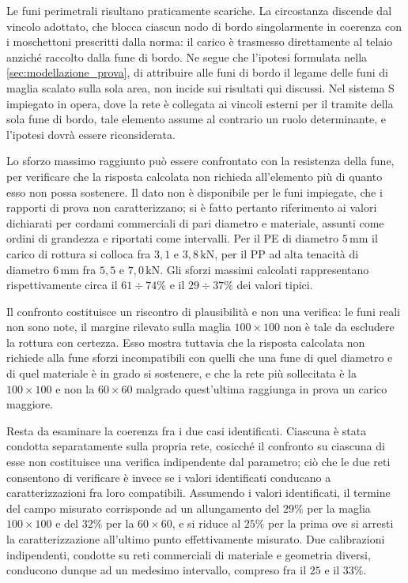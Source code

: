 Le funi perimetrali risultano praticamente scariche. La circostanza discende dal vincolo adottato, che blocca ciascun nodo di bordo singolarmente in coerenza con i moschettoni prescritti dalla norma: il carico è trasmesso direttamente al telaio anziché raccolto dalla fune di bordo. Ne segue che l'ipotesi formulata nella \cref{sec:modellazione_prova}, di attribuire alle funi di bordo il legame delle funi di maglia scalato sulla sola area, non incide sui risultati qui discussi. Nel sistema S impiegato in opera, dove la rete è collegata ai vincoli esterni per il tramite della sola fune di bordo, tale elemento assume al contrario un ruolo determinante, e l'ipotesi dovrà essere riconsiderata.

Lo sforzo massimo raggiunto può essere confrontato con la resistenza della fune, per verificare che la risposta calcolata non richieda all'elemento più di quanto esso non possa sostenere. Il dato non è disponibile per le funi impiegate, che i rapporti di prova non caratterizzano; si è fatto pertanto riferimento ai valori dichiarati per cordami commerciali di pari diametro e materiale, assunti come ordini di grandezza e riportati come intervalli. Per il PE di diametro $5\,\text{mm}$ il carico di rottura si colloca fra $3,1$ e $3,8\,\text{kN}$, per il PP ad alta tenacità di diametro $6\,\text{mm}$ fra $5,5$ e $7,0\,\text{kN}$. Gli sforzi massimi calcolati rappresentano rispettivamente circa il $61\div74\%$ e il $29\div37\%$ dei valori tipici.

Il confronto costituisce un riscontro di plausibilità e non una verifica: le funi reali non sono note, il margine rilevato sulla maglia $100\times100$ non è tale da escludere la rottura con certezza. Esso mostra tuttavia che la risposta calcolata non richiede alla fune sforzi incompatibili con quelli che una fune di quel diametro e di quel materiale è in grado si sostenere, e che la rete più sollecitata è la $100\times100$ e non la $60\times60$ malgrado quest'ultima raggiunga in prova un carico maggiore. 

Resta da esaminare la coerenza fra i due casi identificati. Ciascuna è stata condotta separatamente sulla propria rete, cosicché il confronto su ciascuna di esse non costituisce una verifica indipendente dal parametro; ciò che le due reti consentono di verificare è invece se i valori identificati conducano a caratterizzazioni fra loro compatibili. Assumendo i valori identificati, il termine del campo misurato corrisponde ad un allungamento del $29\%$ per la maglia $100\times100$ e del $32\%$ per la $60\times60$, e si riduce al $25\%$ per la prima ove si arresti la caratterizzazione all'ultimo punto effettivamente misurato. Due calibrazioni indipendenti, condotte su reti commerciali di materiale e geometria diversi, conducono dunque ad un medesimo intervallo, compreso fra il $25$ e il $33\%$. 


